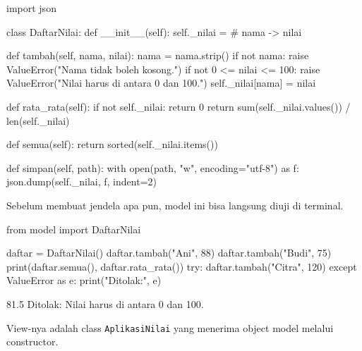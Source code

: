 \begin{kode}[model.py]
import json

class DaftarNilai:
    def __init__(self):
        self._nilai = {}                         # nama -> nilai

    def tambah(self, nama, nilai):
        nama = nama.strip()
        if not nama:
            raise ValueError("Nama tidak boleh kosong.")
        if not 0 <= nilai <= 100:
            raise ValueError("Nilai harus di antara 0 dan 100.")
        self._nilai[nama] = nilai

    def rata_rata(self):
        if not self._nilai:
            return 0
        return sum(self._nilai.values()) / len(self._nilai)

    def semua(self):
        return sorted(self._nilai.items())

    def simpan(self, path):
        with open(path, "w", encoding="utf-8") as f:
            json.dump(self._nilai, f, indent=2)
\end{kode}

Sebelum membuat jendela apa pun, model ini bisa langsung diuji di terminal.

\begin{kode}
from model import DaftarNilai

daftar = DaftarNilai()
daftar.tambah("Ani", 88)
daftar.tambah("Budi", 75)
print(daftar.semua(), daftar.rata_rata())
try:
    daftar.tambah("Citra", 120)
except ValueError as e:
    print("Ditolak:", e)
\end{kode}

\begin{keluaran}
 81.5
Ditolak: Nilai harus di antara 0 dan 100.
\end{keluaran}

View-nya adalah class \texttt{AplikasiNilai} yang menerima object model melalui constructor.

